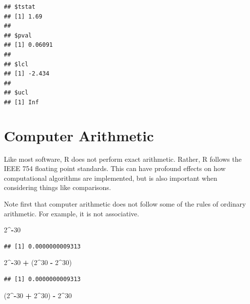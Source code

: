 \documentclass[
]{krantz}
\newenvironment{Shaded}{\begin{snugshade}}{\end{snugshade}}
\newcommand{\DecValTok}[1]{\textcolor[rgb]{0.00,0.00,0.81}{#1}}
\newcommand{\NormalTok}[1]{#1}
\newcommand{\OperatorTok}[1]{\textcolor[rgb]{0.81,0.36,0.00}{\textbf{#1}}}
\newcommand{\StringTok}[1]{\textcolor[rgb]{0.31,0.60,0.02}{#1}}
\begin{document}
\begin{verbatim}
## $tstat
## [1] 1.69
## 
## $pval
## [1] 0.06091
## 
## $lcl
## [1] -2.434
## 
## $ucl
## [1] Inf
\end{verbatim}

\hypertarget{arith}{%
\section{Computer Arithmetic}\label{arith}}

Like most software, R does not perform exact arithmetic. Rather, R follows the IEEE 754 floating point standards. This can have profound effects on how computational algorithms are implemented, but is also important when considering things like comparisons.

Note first that computer arithmetic does not follow some of the rules of ordinary arithmetic. For example, it is not associative.

\begin{Shaded}
\begin{Highlighting}[]
\DecValTok{2}\OperatorTok{\^{}{-}}\DecValTok{30}
\end{Highlighting}
\end{Shaded}

\begin{verbatim}
## [1] 0.0000000009313
\end{verbatim}

\begin{Shaded}
\begin{Highlighting}[]
\DecValTok{2}\OperatorTok{\^{}{-}}\DecValTok{30} \OperatorTok{+}\StringTok{ }\NormalTok{(}\DecValTok{2}\OperatorTok{\^{}}\DecValTok{30} \OperatorTok{{-}}\StringTok{ }\DecValTok{2}\OperatorTok{\^{}}\DecValTok{30}\NormalTok{)}
\end{Highlighting}
\end{Shaded}

\begin{verbatim}
## [1] 0.0000000009313
\end{verbatim}

\begin{Shaded}
\begin{Highlighting}[]
\NormalTok{(}\DecValTok{2}\OperatorTok{\^{}{-}}\DecValTok{30} \OperatorTok{+}\StringTok{ }\DecValTok{2}\OperatorTok{\^{}}\DecValTok{30}\NormalTok{) }\OperatorTok{{-}}\StringTok{ }\DecValTok{2}\OperatorTok{\^{}}\DecValTok{30}
\end{Highlighting}
\end{Shaded}
\end{document}
